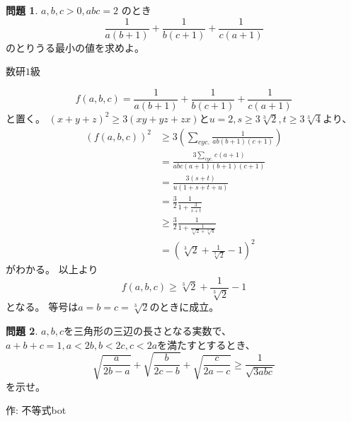 \documentclass[uplatex, a5paper]{jsarticle}
\makeatletter
\theoremstyle{definition}
\newtheorem{prob}{問題}
\renewenvironment{proof}[1][\proofname]{
  \pushQED{\qed}%
  \normalfont \topsep6\p@\@plus6\p@\relax
  \trivlist
  \item[\hskip\labelsep
    #1\@addpunct{\textbf{.}}]\ignorespaces
}{%
  \popQED\endtrivlist\@endpefalse
}
\providecommand{\proofname}{証明}
\def\qed{\hfill $\Box$}
\makeatother
\begin{document}
\newpage

\begin{prob}
  \(a , b , c > 0 , abc = 2\)
  のとき
  \[
  \frac{1}{a(b+1)} + \frac{1}{b(c+1)} + \frac{1}{c(a+1)}
  \]
  のとりうる最小の値を求めよ。
  \begin{flushright}
    数研\(1\)級
  \end{flushright}
\end{prob}


\begin{proof}
  \[
  f(a,b,c) = \frac{1}{a(b+1)} + \frac{1}{b(c+1)} + \frac{1}{c(a+1)}
  \]
  と置く。
  \((x+y+z)^2 \geq 3(xy+yz+zx)\)と\(u=2, s\geq 3\sqrt[3]{2}, t \geq 3\sqrt[3]{4}\)より、
  \begin{align*}
    ( f(a,b,c) )^2 &\geq 3\left( \sum_{cyc.} \frac{1}{ab(b+1)(c+1)} \right) \\
    &= \frac{3\sum_{cyc.} c(a+1) }{abc(a+1)(b+1)(c+1)} \\
    &= \frac{3(s+t) }{u(1+s+t+u)} \\
    &= \frac{3}{2} \frac{1}{1+\frac{3}{s+t}} \\
    &\geq \frac{3}{2} \frac{1}{1+\frac{1}{\sqrt[3]{2}+\sqrt[3]{4}}} \\
    &= \left( \sqrt[3]{2} + \frac{1}{\sqrt[3]{2}} - 1 \right) ^2
  \end{align*}
  がわかる。
  以上より
  \[f(a,b,c) \geq \sqrt[3]{2} + \frac{1}{\sqrt[3]{2}} - 1\]
  となる。
  等号は\(a=b=c=\sqrt[3]{2}\)のときに成立。
\end{proof}












\newpage

\begin{prob}
  \(a,b,c\)を三角形の三辺の長さとなる実数で、
  \(a+b+c = 1 , a < 2b , b < 2c , c < 2a \)を満たすとするとき、
  \[
  \sqrt{\frac{a}{2b-a}} + \sqrt{\frac{b}{2c-b}} + \sqrt{\frac{c}{2a-c}} \geq \frac{1}{\sqrt{3abc}}
  \]
  を示せ。
  \begin{flushright}
    作: 不等式bot
  \end{flushright}
\end{prob}
\end{document}
